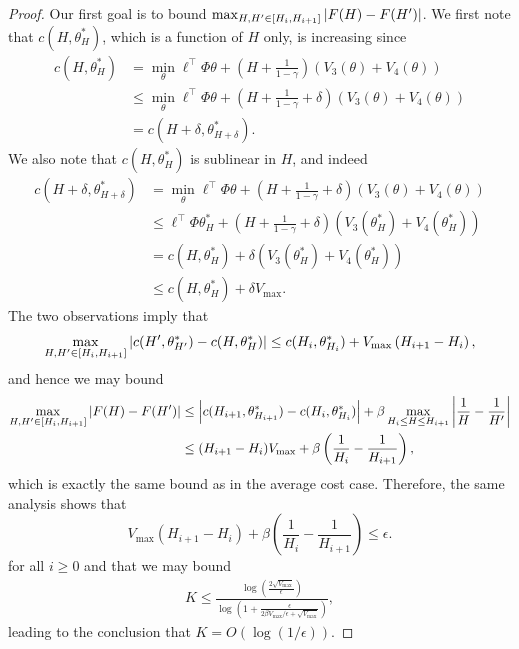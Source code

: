 \documentclass[11pt]{article}
\begin{document}
\begin{proof}
  Our first goal is to bound $\max_{H, H'\in [H_i, H_{i+1}]} \left\vert F(H) - F(H')\right\vert$. We first note that $c(H,\theta^*_H)$, which is a function of $H$ only, is increasing since 
\begin{align*}
  c(H,\theta^*_H)
  & =
    \min_{\theta}\ell^\top\Phi\theta + \left(H+\frac{1}{1-\gamma}\right)(V_3(\theta)+V_4(\theta))\\
  &\leq
    \min_{\theta}\ell^\top\Phi\theta + \left(H+\frac{1}{1-\gamma}+\delta\right)(V_3(\theta)+V_4(\theta))\\
  &=
  c(H+\delta,\theta^*_{H+\delta}).
\end{align*}
We also note that $c(H,\theta^*_H)$ is sublinear in $H$, and indeed 
\begin{align*}
  c(H+\delta,\theta^*_{H+\delta})
  &=
    \min_\theta \ell^\top\Phi\theta + \left(H+\frac{1}{1-\gamma}+\delta\right)(V_3(\theta)+V_4(\theta))\\
  &\leq
    \ell^\top\Phi\theta^*_H + \left(H+\frac{1}{1-\gamma}+\delta\right)(V_3(\theta^*_H)+V_4(\theta^*_H))\\
  &=
      c(H,\theta^*_{H}) + \delta(V_3(\theta^*_H)+V_4(\theta^*_H))\\
  &\leq c(H,\theta^*_{H}) + \delta V_{\max}.
\end{align*}
The two observations imply that
\begin{align*}
  \max_{H, H'\in [H_i, H_{i+1}]} \left\vert c(H',\theta^*_{H'}) - c(H,\theta^*_H)\right\vert
  \leq
  c(H_i,\theta^*_{H_i}) + V_{\max}\left( H_{i+1} - H_i\right),
\end{align*}
and hence we may bound
\begin{align*}
  \max_{H, H'\in [H_i, H_{i+1}]} \left\vert F(H) - F(H')\right\vert
  &\leq
   \left\vert c(H_{i+1}, \theta^*_{H_{i+1}}) - c(H_{i}, \theta^*_{H_i})\right\vert
    + \beta \max_{H_i\leq H\leq H_{i+1}}\left\vert\frac{1}{H} - \frac{1}{H'}\right\vert\\
  &\leq
    (H_{i+1}-H_i)V_{\max}
    + \beta\left(\frac{1}{H_{i}} - \frac{1}{H_{i+1}}\right),
\end{align*}
which is exactly the same bound as in the average cost case. Therefore, the same analysis shows that
\[
  V_{\max}(H_{i+1}-H_i)
  + \beta\left(\frac{1}{H_{i}} - \frac{1}{H_{i+1}}\right) \leq \epsilon.
\]
for all $i \geq 0$ and that we may bound 
\begin{align*}
                     K    \leq
                           \frac{\log\left(\frac{2\sqrt{V_{\max}}}{\epsilon}\right)}{\log \left( 1 +  \frac{\epsilon}{ 2\beta V_{\max}/\epsilon +\sqrt{V_{\max}}}\right)},                           
  \end{align*}
  leading to the conclusion that $K = O(\log(1/\epsilon))$.
  
\end{proof}
\end{document}

